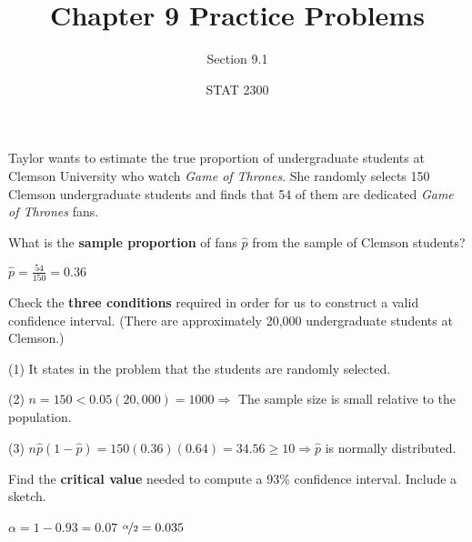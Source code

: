\documentclass[noanswers]{exam}
\title{Chapter 9 Practice Problems}
\author{Section 9.1}
\date{STAT 2300}
\begin{document}
%

\noindent Taylor wants to estimate the true proportion of undergraduate students at Clemson University who watch \textit{Game of Thrones}. She randomly selects 150 Clemson undergraduate students and finds that 54 of them are dedicated \textit{Game of Thrones} fans.
\begin{questions} 

\question What is the \textbf{sample proportion} of fans $\hat{p}$ from the sample of Clemson students?

\begin{solution}[\stretch{1}]
\vspace{1mm}

$\hat{p}=\frac{54}{150}=0.36$

\vspace{1mm}
\end{solution}

\question Check the \textbf{three conditions} required in order for us to construct a valid confidence interval. (There are approximately 20,000 undergraduate students at Clemson.)

\begin{solution}[\stretch{1}]

\vspace{1mm}

(1) It states in the problem that the students are randomly selected.

\vspace{2mm}

(2) $n=150<0.05(20,000)=1000 \Rightarrow$ The sample size is small relative to the population.

\vspace{2mm}

(3) $n\hat{p}(1-\hat{p})=150(0.36)(0.64)=34.56\geq 10 \Rightarrow \hat{p}$ is normally distributed.

\vspace{1mm}
\end{solution}

\question Find the \textbf{critical value} needed to compute a 93\% confidence interval. Include a sketch.

\begin{solution}[\stretch{1}]
\vspace{1mm}
$\alpha=1-0.93=0.07$ \hspace{10mm} $\nicefrac{\alpha}{2}=0.035$


\end{solution}
\end{questions}
\end{document}
